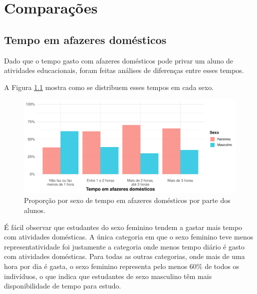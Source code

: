 

\chapter{Comparações}
\section{Tempo em afazeres domésticos}
Dado que o tempo gasto com afazeres domésticos pode privar um aluno
de atividades educacionais, foram feitas análises de diferenças entre
esses tempos.

A Figura \ref{sexo_afazeres} mostra como se distribuem esses tempos em cada sexo.
\begin{figure}[h]
    \label{sexo_afazeres}
    \caption{Proporção por sexo de tempo em afazeres domésticos por parte
    dos alunos.}
    \begin{center}
        \includegraphics[width=16cm]{img/sexo_afazeres.pdf}
    \end{center}
\end{figure}

É fácil observar que estudantes do sexo feminino tendem a gastar mais tempo com atividades
domésticas. A única categoria em que o sexo feminino teve menos representatividade foi
justamente a categoria onde menos tempo diário é gasto com atividades domésticas.
Para todas as outras categorias, onde mais de uma hora por dia é gasta, o sexo feminino
representa pelo menos 60\% de todos os indivíduos, o que indica que estudantes de
sexo masculino têm mais disponibilidade de tempo para estudo.


